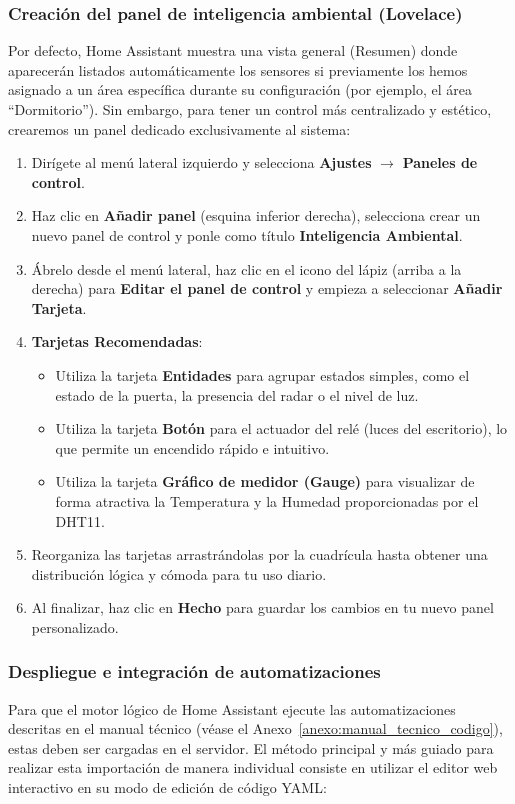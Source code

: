 \subsubsection{Creación del panel de inteligencia ambiental (Lovelace)}
Por defecto, Home Assistant muestra una vista general (Resumen) donde aparecerán listados automáticamente los sensores si previamente los hemos asignado a un área específica durante su configuración (por ejemplo, el área ``Dormitorio''). Sin embargo, para tener un control más centralizado y estético, crearemos un panel dedicado exclusivamente al sistema:
\begin{enumerate}
    \item Dirígete al menú lateral izquierdo y selecciona \textbf{Ajustes} $\rightarrow$ \textbf{Paneles de control}.
    \item Haz clic en \textbf{Añadir panel} (esquina inferior derecha), selecciona crear un nuevo panel de control y ponle como título \textbf{Inteligencia Ambiental}.
    \item Ábrelo desde el menú lateral, haz clic en el icono del lápiz (arriba a la derecha) para \textbf{Editar el panel de control} y empieza a seleccionar \textbf{Añadir Tarjeta}.
    \item \textbf{Tarjetas Recomendadas}:
    \begin{itemize}
        \item Utiliza la tarjeta \textbf{Entidades} para agrupar estados simples, como el estado de la puerta, la presencia del radar o el nivel de luz.
        \item Utiliza la tarjeta \textbf{Botón} para el actuador del relé (luces del escritorio), lo que permite un encendido rápido e intuitivo.
        \item Utiliza la tarjeta \textbf{Gráfico de medidor (Gauge)} para visualizar de forma atractiva la Temperatura y la Humedad proporcionadas por el DHT11.
    \end{itemize}
    \item Reorganiza las tarjetas arrastrándolas por la cuadrícula hasta obtener una distribución lógica y cómoda para tu uso diario.
    \item Al finalizar, haz clic en \textbf{Hecho} para guardar los cambios en tu nuevo panel personalizado.
\end{enumerate}

\subsubsection{Despliegue e integración de automatizaciones}
Para que el motor lógico de Home Assistant ejecute las automatizaciones descritas en el manual técnico (véase el Anexo~\ref{anexo:manual_tecnico_codigo}), estas deben ser cargadas en el servidor. El método principal y más guiado para realizar esta importación de manera individual consiste en utilizar el editor web interactivo en su modo de edición de código YAML:

